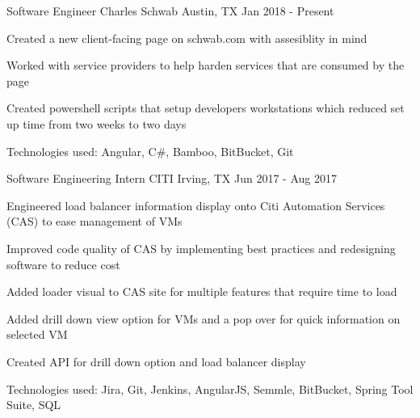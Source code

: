 

\begin{cventries}

  \cventry
    {Software Engineer} %
    {Charles Schwab} %
    {Austin, TX} %
    {Jan 2018 - Present} %
    {
      \begin{cvitems} %
        \item {Created a new client-facing page on schwab.com with assesiblity in mind }
        \item {Worked with service providers to help harden services that are consumed by the page}
        \item {Created powershell scripts that setup developers workstations which reduced set up time from two weeks to two days}
        \item {Technologies used: Angular, C\#, Bamboo, BitBucket, Git }
      \end{cvitems}
    }
      
  \cventry
    {Software Engineering Intern} %
    {CITI} %
    {Irving, TX} %
    {Jun 2017 - Aug 2017} %
    {
      \begin{cvitems} %
        \item {Engineered load balancer information display onto Citi Automation Services (CAS) to ease management of VMs}
        \item {Improved code quality of CAS by implementing best practices and redesigning software to reduce cost}
        \item {Added loader visual to CAS site for multiple features that require time to load}
        \item {Added drill down view option for VMs and a pop over for quick information on selected VM}
        \item {Created API for drill down option and load balancer display}
        \item {Technologies used: Jira, Git, Jenkins, AngularJS, Semmle, BitBucket, Spring Tool Suite, SQL }
      \end{cvitems}
    }


\end{cventries}
